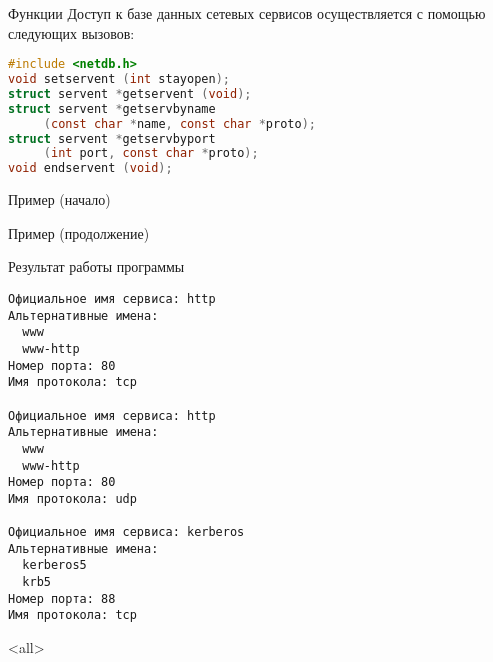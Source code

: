 \begin{frame}[fragile]{Функции}
Доступ к базе данных сетевых сервисов осуществляется с помощью следующих вызовов:
\scriptsize\begin{lstlisting}[language=C]
#include <netdb.h>
void setservent (int stayopen);
struct servent *getservent (void);
struct servent *getservbyname 
     (const char *name, const char *proto);
struct servent *getservbyport 
     (int port, const char *proto);
void endservent (void);
\end{lstlisting}
\end{frame}

\begin{frame}[fragile]{Пример (начало)}
\tiny
\end{frame}

\begin{frame}[fragile]{Пример (продолжение)}
\tiny
\end{frame}

\begin{frame}[fragile]{Результат работы программы}
\scriptsize\begin{verbatim}
Официальное имя сервиса: http
Альтернативные имена:
  www
  www-http
Номер порта: 80
Имя протокола: tcp

Официальное имя сервиса: http
Альтернативные имена:
  www
  www-http
Номер порта: 80
Имя протокола: udp

Официальное имя сервиса: kerberos
Альтернативные имена:
  kerberos5
  krb5
Номер порта: 88
Имя протокола: tcp
\end{verbatim}
\end{frame}


\mode<all>{}


